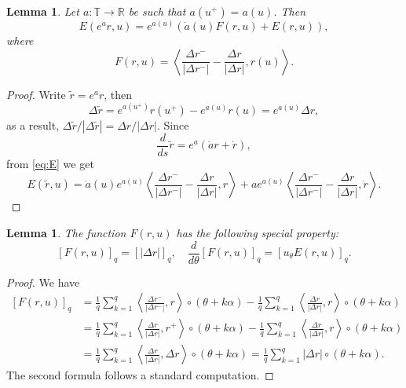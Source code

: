 \documentclass[12pt,reqno]{amsart}
\newtheorem{lem}[thm]{Lemma}
\theoremstyle{remark}
\begin{document}
\begin{lem}\label{lem:prjection}
Let $a: {\mathbb{T}} \to {\mathbb{R}}$ be such that $a(u^+) = a(u)$. Then 
\[
	E(e^{a}r, u) = e^{a(u)} \left( \dot{a}(u) F(r, u) +  E(r, u) \right), 
\]
where 
\[
	F(r, u) = \left\langle
	\frac{\Delta r^-}{|\Delta r^-|} - \frac{\Delta r}{|\Delta r|} , r(u)
	\right\rangle. 
\]
\end{lem}
\begin{proof}
	Write ${\tilde{r}} = e^a r$, then
	\[
		\Delta {\tilde{r}} = e^{a(u^+)} r(u^+)  - e^{a(u)} r(u) = 
		e^{a(u)}\Delta r, 
	\]
	as a result, $\Delta {\tilde{r}} / |\Delta {\tilde{r}}| = \Delta r / |\Delta r|$. Since 
	\[
		\frac{d}{ds} {\tilde{r}} = e^a\left(  \dot{a} r +  \dot{r} \right), 
	\]
	from \eqref{eq:E} we get 
	\[
		E({\tilde{r}}, u) = \dot{a}(u) e^{a(u)} \left\langle  \frac{\Delta r^-}{|\Delta r^-|} - \frac{\Delta r}{|\Delta r|} ,  r \right\rangle + a e^{a(u)} \left\langle  \frac{\Delta r^-}{|\Delta r^-|} - \frac{\Delta r}{|\Delta r|} , \dot{r} \right\rangle. 
	\]
\end{proof}

\begin{lem}\label{lem:F-const}
The function $F(r, u)$ has the following special property:
\[
	[F(r, u)]_q = [|\Delta r|]_q, 
	\quad 
	\frac{d}{d\theta}[F(r, u)]_q =  [u_\theta E(r, u)]_q. 
\]
\end{lem}
\begin{proof}
	We have 
	\[
		\begin{aligned}
			{[F(r, u)]_q}  &= \frac{1}{q} \sum_{k = 1}^q \left \langle \frac{\Delta r^-}{|\Delta r^-|} , r \right \rangle \circ (\theta + k \alpha) -
			\frac{1}{q} \sum_{k = 1}^q \left \langle \frac{\Delta r}{|\Delta r|} , r \right \rangle \circ (\theta + k \alpha) \\
			& = \frac{1}{q} \sum_{k = 1}^q \left \langle \frac{\Delta r}{|\Delta r|} , r^+ \right \rangle \circ (\theta + k \alpha) -
			\frac{1}{q} \sum_{k = 1}^q \left \langle \frac{\Delta r}{|\Delta r|} , r \right \rangle \circ (\theta + k \alpha) \\
			& = \frac{1}{q} \sum_{k = 1}^q \left \langle \frac{\Delta r}{|\Delta r|} , \Delta r \right \rangle \circ (\theta + k \alpha) = \frac{1}{q} \sum_{k = 1}^q |\Delta r| \circ  (\theta + k \alpha). 
		\end{aligned}
	\]
	The second formula follows a standard computation. 
\end{proof}
\end{document}
